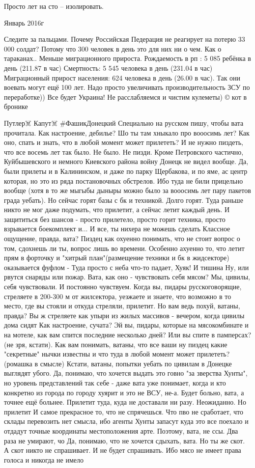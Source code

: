 Просто лет на сто – изолировать.

Январь 2016г

Следите за пальцами. Почему Российская Педерация не реагирует на потерю 33 000
солдат? Потому что 300 человек в день это для них ни о чем. Как о тараканах..
Меньше миграционного прироста. Рождаемость в рп : 5 085 ребёнка в день (211.87
в час) Смертность: 5 545 человека в день (231.04 в час) Миграционный прирост
населения: 624 человека в день (26.00 в час). Так они воевать могут ещё 100
лет. Надо просто увеличивать производительность ЗСУ по переработке)) Все будет
Украина! Не расслабляемся и чистим кулеметы) © кот в бронике

Путлер☠️ Капут☠️
#ФашикДонецкий Специально на русском пишу, чтобы вата прочитала.
Как настроение, дебилье? Шо ты там хныкало про вооосимь лет? Как оно, спать и знать, что в любой момент может прилететь?
И не нужно пиздеть, что все восемь лет так было. Не было. Не пизди. Кроме Петровского частично, Куйбышевского и немного Киевского района войну Донецк не видел вообще. Да, были прилеты и в Калининском, и даже по парку Щербакова, и по яме, ас центр которая, но это из ряда постановочных обстрелов. Ибо туда не били прицельно вообще (хотя в то же мыгыбы дыныры можно было за вооосимь лет пару пакетов града уебать).
Но сейчас горят базы с бк и техникой.
Долго горят.
Туда раньше никто не мог даже подумать, что прилетит, а сейчас летит каждый день.
И защититься без шансов - просто прилетело, просто горит техника, просто взрывается боекомплект и...
И все, ты нихера не можешь сделать
Классное ощущение, правда, вата? Пиздец как охуенно понимать, что не стоит вопрос о том, сдохнешь ли ты, вопрос лишь во времени. Особенно ахуенно то, что летит прям в форточку и "хитрый план"(размещение техники и бк в жидсекторе) оказывается фуфлом - Туда просто с неба что-то падает, Хуяк! И тишина
Ну, или рвутся снаряды или пожар.
Вата, как оно - чувствовать себя мясом?
Мы, цивилы, себя чувствовали. И постоянно чувствуем.
Когда вы, пидары русскоговорящие, стреляете в 200-300 м от жилсектора, уезжаете и знаете, что возможно в то место, где вы стояли и откуда стреляли, прилетит.
Но вам ведь похуй, ватаны, правда?
Вы ж стреляете как упыри из жилых массивов - вечером, когда цивилы дома сидят
Как настроение, сучата? Эй вы, пидары, которые на мясокомбинате и на мотеле, как вам спится последние несколько дней?
Или вы спите в памперсах?(не зря, кстати). Как вам понимать, ватаны, что все ваши ну пиздец какие "секретные" нычки известны и что туда в любой момент может прилететь?(ромашка в смысле)
Кстати, ватаны, попытки уебать по цивилам в Донецке выглядят убого. Да, понимаю, что хочется выдать это говно "за зверства Хунты", но уровень представлений так себе - даже вата уже понимает, когда и кто конкретно из города по городу хуярит и это не ВСУ, не-а.
Будет больно, вата, а точнее ещё больнее. Прилетит туда, куда не доставали ни разу. Неожиданно. Но прилетит
И самое прекрасное то, что не спрячешься. Что пво не сработает, что склады перевозить нет смысла, ибо агенты Хунты запасут куда это все поехало и отдадут точные координаты местоположения арте. Поэтому, вата, не ссы. Два раза не умирают, чо
Да, понимаю, что не хочется сдыхать, вата. Но ты же скот. А скот никто не спрашивает. И не будет спрашивать. Ибо мясо не имеет права голоса и никогда не имело
